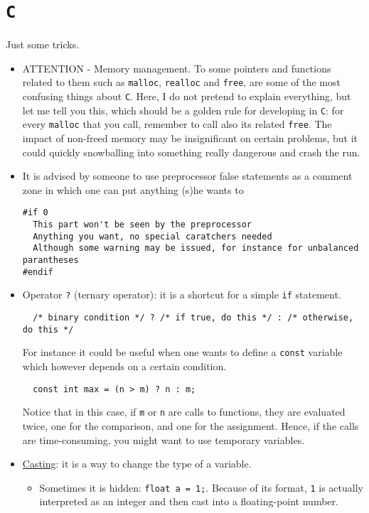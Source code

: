 \documentclass[a4paper,12pt,%
              final%
              ]{article}
\begin{document}
\section{\texttt{C}}
\label{sec:c}
Just some tricks.
\begin{itemize}
  \item ATTENTION - Memory management. To some pointers and functions related to them such as \texttt{malloc}, \texttt{realloc} and \texttt{free}, are some of the most confusing things about \texttt{C}. Here, I do not pretend to explain everything, but let me tell you this, which should be a golden rule for developing in \texttt{C}: for every \texttt{malloc} that you call, remember to call also its related \texttt{free}. The impact of non-freed memory may be insignificant on certain problems, but it could quickly snowballing into something really dangerous and crash the run.
  \item It is advised by someone to use preprocessor false statements as a comment zone in which one can put anything (s)he wants to
\begin{verbatim}
#if 0
  This part won't be seen by the preprocessor
  Anything you want, no special caratchers needed
  Although some warning may be issued, for instance for unbalanced parantheses
#endif
\end{verbatim}
  \item Operator \verb|?| (ternary operator): it is a shortcut for a simple \texttt{if} statement.
\begin{verbatim}
  /* binary condition */ ? /* if true, do this */ : /* otherwise, do this */
\end{verbatim}
    For instance it could be useful when one wants to define a \texttt{const} variable which however depends on a certain condition.
\begin{verbatim}
  const int max = (n > m) ? n : m;
\end{verbatim}
    Notice that in this case, if \verb|m| or \verb|n| are calls to functions, they are evaluated twice, one for the comparison, and one for the assignment. Hence, if the calls are time-consuming, you might want to use temporary variables.
  \item \href{https://www.improgrammer.net/type-casting-c-language/}{Casting}: it is a way to change the type of a variable.
    \begin{itemize}
      \item Sometimes it is hidden: \verb|float a = 1;|. Because of its format, \verb|1| is actually interpreted as an integer and then cast into a floating-point number.

\end{itemize}
\end{itemize}
\end{document}
